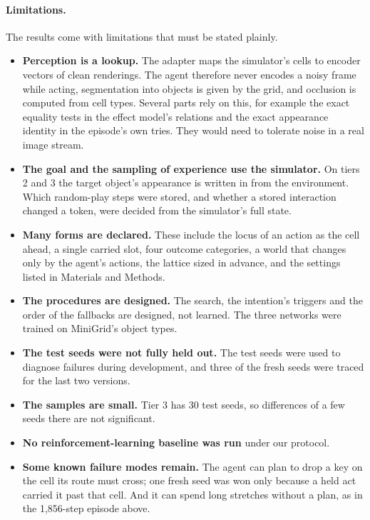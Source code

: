 \documentclass{article}
\begin{document}
\paragraph{Limitations.} The results come with limitations that must be stated plainly.
\begin{itemize}
    \item \textbf{Perception is a lookup.} The adapter maps the simulator's cells to encoder vectors of clean renderings. The agent therefore never encodes a noisy frame while acting, segmentation into objects is given by the grid, and occlusion is computed from cell types. Several parts rely on this, for example the exact equality tests in the effect model's relations and the exact appearance identity in the episode's own tries. They would need to tolerate noise in a real image stream.
    \item \textbf{The goal and the sampling of experience use the simulator.} On tiers 2 and 3 the target object's appearance is written in from the environment. Which random-play steps were stored, and whether a stored interaction changed a token, were decided from the simulator's full state.
    \item \textbf{Many forms are declared.} These include the locus of an action as the cell ahead, a single carried slot, four outcome categories, a world that changes only by the agent's actions, the lattice sized in advance, and the settings listed in Materials and Methods.
    \item \textbf{The procedures are designed.} The search, the intention's triggers and the order of the fallbacks are designed, not learned. The three networks were trained on MiniGrid's object types.
    \item \textbf{The test seeds were not fully held out.} The test seeds were used to diagnose failures during development, and three of the fresh seeds were traced for the last two versions.
    \item \textbf{The samples are small.} Tier 3 has 30 test seeds, so differences of a few seeds there are not significant.
    \item \textbf{No reinforcement-learning baseline was run} under our protocol.
    \item \textbf{Some known failure modes remain.} The agent can plan to drop a key on the cell its route must cross; one fresh seed was won only because a held act carried it past that cell. And it can spend long stretches without a plan, as in the 1,856-step episode above.
\end{itemize}
\end{document}
